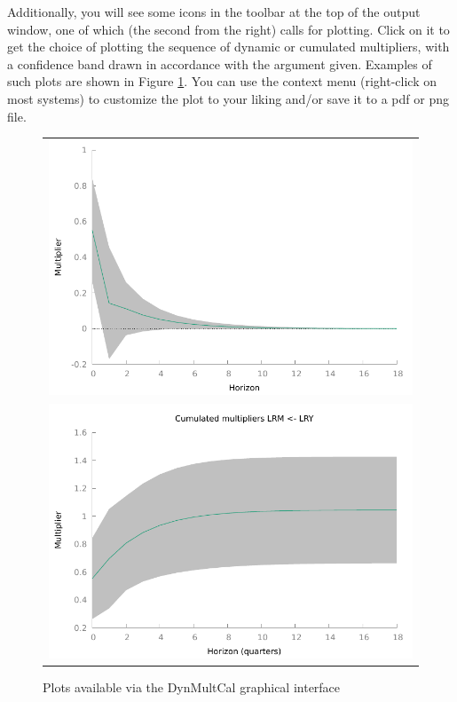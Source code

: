 \documentclass[a4paper,10pt]{article}
\begin{document}
Additionally, you will see some icons in the toolbar at the top of the output window, one of which
(the second from the right) calls for plotting. Click on it to get the choice of plotting the
sequence of dynamic or cumulated multipliers, with a confidence band drawn in accordance with the
argument given. Examples of such plots are shown in Figure \ref{fig:mults}. You can use the context
menu (right-click on most systems) to customize the plot to your liking and/or save it to a
\textsf{pdf} or \textsf{png} file.

\begin{figure}[htbp]
  \label{fig:mults}
  \begin{center}
  \begin{tabular}{c}
    \includegraphics[scale=0.75]{m_example} \\[10pt]
    \includegraphics[scale=0.75]{cm_example}
  \end{tabular}
  \caption{Plots available via the \textsf{DynMultCal} graphical
    interface}
  \end{center}
\end{figure}
\clearpage
\end{document}

